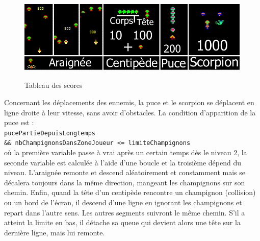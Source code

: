 \begin{figure}[ht]%
\center
\caption{Tableau des scores}%
\smallskip
\includegraphics[width=\textwidth]{imgs/scoresCentipede.png}%
\label{fig:ScoresCenti}%
\end{figure}

Concernant les déplacements des ennemis, la puce et le scorpion se déplacent en ligne droite à leur vitesse, sans avoir d'obstacles. La condition d'apparition de la puce est :\\\texttt{pucePartieDepuisLongtemps\\\&\& nbChampignonsDansZoneJoueur <= limiteChampignons}\\où la première variable passe à vrai après un certain temps dès le niveau 2, la seconde variable est calculée à l'aide d'une boucle et la troisième dépend du niveau. L'araignée remonte et descend aléatoirement et constamment mais se décalera toujours dans la même direction, mangeant les champignons sur son chemin. Enfin, quand la tête d'un centipède rencontre un champignon (collision) ou un bord de l'écran, il descend d'une ligne en ignorant les champignons et repart dans l'autre sens. Les autres segments suivront le même chemin. S'il a atteint la limite en bas, il détache sa queue qui devient alors une tête sur la dernière ligne, mais lui remonte.


